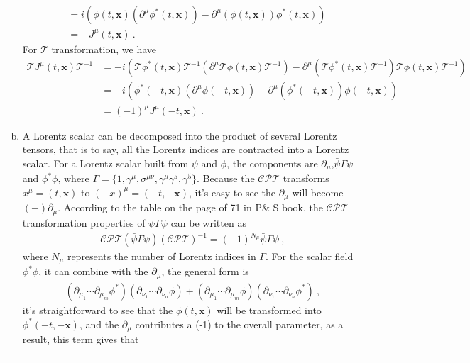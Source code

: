 \documentclass[12pt]{report}
\numberwithin{problemname}{chapter}
\newenvironment{solution}{\vspace{1em}\par\noindent{\large\textbf{\textsc{Solution}}}\par}{\vspace{1em}\hrule}
\begin{document}
\begin{solution}
\begin{enumerate}[(a)]
\begin{align}
        &=i(\phi(t,\mathbf{x})(\partial^{\mu}\phi^*(t,\mathbf{x}))-\partial^{\mu}(\phi(t,\mathbf{x}))\phi^*(t,\mathbf{x})) \nonumber \\
        &=-J^{\mu}(t,\mathbf{x})\ .
    \end{align}
    For $\mathcal{T}$ transformation, we have
    \begin{align}
        \mathcal{T}J^{\mu}(t,\mathbf{x})\mathcal{T}^{-1}&=-i(\mathcal{T}\phi^*(t,\mathbf{x})\mathcal{T}^{-1}(\partial^{\mu}\mathcal{T}\phi(t,\mathbf{x})\mathcal{T}^{-1})-\partial^{\mu}(\mathcal{T}\phi^*(t,\mathbf{x})\mathcal{T}^{-1})\mathcal{T}\phi(t,\mathbf{x})\mathcal{T}^{-1}) \nonumber \\
        &=-i(\phi^*(-t,\mathbf{x})(\partial^{\mu}\phi(-t,\mathbf{x}))-\partial^{\mu}(\phi^*(-t,\mathbf{x}))\phi(-t,\mathbf{x})) \nonumber \\
        &=(-1)^{\mu}J^{\mu}(-t,\mathbf{x})\ .
    \end{align}
    \item A Lorentz scalar can be decomposed into the product of several Lorentz tensors, that is to say, all the Lorentz indices are contracted into a Lorentz scalar. For a Lorentz scalar built from $\psi$ and $\phi$, the components are $\partial_{\mu}$,$\bar{\psi}\Gamma\psi$ and $\phi^*\phi$, where $\Gamma=\{1,\gamma^{\mu},\sigma^{\mu\nu},\gamma^{\mu}\gamma^5,\gamma^5\}$. Because the $\mathcal{CPT}$ transforms $x^{\mu}=(t,\mathbf{x})$ to $(-x)^{\mu}=(-t,-\mathbf{x})$, it's easy to see the $\partial_{\mu}$ will become $(-)\partial_{\mu}$. According to the table on the page of 71 in P\& S book, the $\mathcal{CPT}$ transformation properties of $\bar{\psi}\Gamma\psi$ can be written as 
    \begin{align}
        \mathcal{CPT}(\bar{\psi}\Gamma\psi)(\mathcal{CPT})^{-1}=(-1)^{N_{\mu}}\bar{\psi}\Gamma\psi\ ,
    \end{align}
    where $N_{\mu}$ represents the number of Lorentz indices in $\Gamma$. For the scalar field $\phi^*\phi$, it can combine with the $\partial_{\mu}$, the general form is
    \begin{align}
        (\partial_{\mu_1}\cdots\partial_{\mu_m}\phi^*)(\partial_{\nu_1}\cdots\partial_{\nu_n}\phi)+(\partial_{\mu_1}\cdots\partial_{\mu_m}\phi)(\partial_{\nu_1}\cdots\partial_{\nu_n}\phi^*)\ ,
    \end{align}
    it's straightforward to see that the $\phi(t,\mathbf{x})$ will be transformed into $\phi^*(-t,-\mathbf{x})$, and the $\partial_{\mu}$ contributes a (-1) to the overall parameter, as a result, this term gives that

\end{enumerate}
\end{solution}
\end{document}
